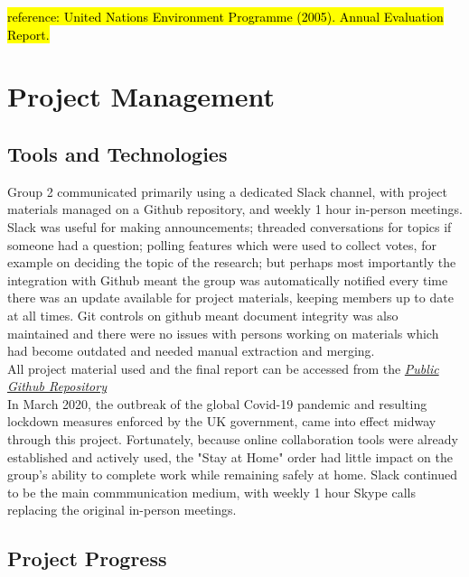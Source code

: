 \documentclass[10pt]{article}\usepackage[]{graphicx}\usepackage[]{color}
\begin{document}
\hl{reference: United Nations Environment Programme (2005). Annual Evaluation Report.}



\pagebreak
\section{Project Management}\label{mgt}
\subsection{Tools and Technologies}
Group 2 communicated primarily using a dedicated Slack channel, with project materials managed on a Github repository, and weekly 1 hour in-person meetings. Slack was useful for making announcements; threaded conversations for topics if someone had a question; polling features which were used to collect votes, for example on deciding the topic of the research; but perhaps most importantly the integration with Github meant the group was automatically notified every time there was an update available for project materials, keeping members up to date at all times. Git controls on github meant document integrity was also maintained and there were no issues with persons working on materials which had become outdated and needed manual extraction and merging.\\

All project material used and the final report can be accessed from the \textit{\href{https://github.com/KarenJewell/CMM507Group2}{Public Github Repository}} \\

In March 2020, the outbreak of the global Covid-19 pandemic and resulting lockdown measures enforced by the UK government, came into effect midway through this project. Fortunately, because online collaboration tools were already established and actively used, the "Stay at Home" order had little impact on the group's ability to complete work while remaining safely at home. Slack continued to be the main commmunication medium, with weekly 1 hour Skype calls replacing the original in-person meetings.\\


\subsection{Project Progress}
\end{document}

